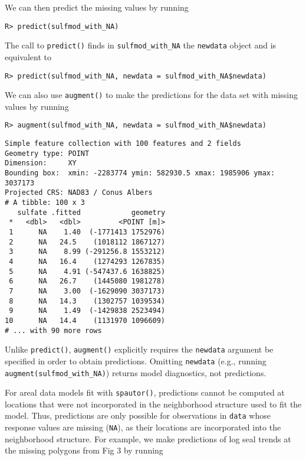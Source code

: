 \documentclass[10pt,letterpaper]{article}
\begin{document}
\noindent We can then predict the missing values by running

\begin{verbatim}
R> predict(sulfmod_with_NA)
\end{verbatim}

\noindent The call to \texttt{predict()} finds in
\texttt{sulfmod\_with\_NA} the \texttt{newdata} object and is equivalent
to

\begin{verbatim}
R> predict(sulfmod_with_NA, newdata = sulfmod_with_NA$newdata)
\end{verbatim}

We can also use \texttt{augment()} to make the predictions for the data
set with missing values by running

\begin{verbatim}
R> augment(sulfmod_with_NA, newdata = sulfmod_with_NA$newdata)
\end{verbatim}

\begin{verbatim}
Simple feature collection with 100 features and 2 fields
Geometry type: POINT
Dimension:     XY
Bounding box:  xmin: -2283774 ymin: 582930.5 xmax: 1985906 ymax: 3037173
Projected CRS: NAD83 / Conus Albers
# A tibble: 100 x 3
   sulfate .fitted            geometry
 *   <dbl>   <dbl>         <POINT [m]>
 1      NA    1.40  (-1771413 1752976)
 2      NA   24.5    (1018112 1867127)
 3      NA    8.99 (-291256.8 1553212)
 4      NA   16.4    (1274293 1267835)
 5      NA    4.91 (-547437.6 1638825)
 6      NA   26.7    (1445080 1981278)
 7      NA    3.00  (-1629090 3037173)
 8      NA   14.3    (1302757 1039534)
 9      NA    1.49  (-1429838 2523494)
10      NA   14.4    (1131970 1096609)
# ... with 90 more rows
\end{verbatim}

\noindent Unlike \texttt{predict()}, \texttt{augment()} explicitly
requires the \texttt{newdata} argument be specified in order to obtain
predictions. Omitting \texttt{newdata} (e.g., running
\texttt{augment(sulfmod\_with\_NA)}) returns model diagnostics, not
predictions.

For areal data models fit with \texttt{spautor()}, predictions cannot be
computed at locations that were not incorporated in the neighborhood
structure used to fit the model. Thus, predictions are only possible for
observations in \texttt{data} whose response values are missing
(\texttt{NA}), as their locations are incorporated into the neighborhood
structure. For example, we make predictions of log seal trends at the
missing polygons from Fig 3 by running
\end{document}
